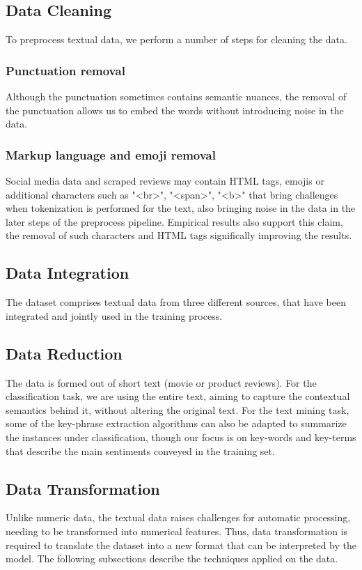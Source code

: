 \subsection{Data Cleaning}
To preprocess textual data, we perform a number of steps for cleaning the data. 

\subsubsection{Punctuation removal}
Although the punctuation sometimes contains semantic nuances, the removal of the punctuation allows us to embed the words without introducing noise in the data.
\subsubsection{Markup language and emoji removal}
Social media data and scraped reviews may contain HTML tags, emojis or additional characters such as "\textless br\textgreater", "\textless span\textgreater", "\textless b\textgreater" that bring challenges when tokenization is performed for the text, also bringing noise in the data in the later steps of the preprocess pipeline. Empirical results also support this claim, the removal of such characters and HTML tags significally improving the results.


\subsection{Data Integration}
The dataset comprises textual data from three different sources, that have been integrated and jointly used in the training process.

\subsection{Data Reduction}
The data is formed out of short text (movie or product reviews). For the classification task, we are using the entire text, aiming to capture the contextual semantics behind it, without altering the original text. For the text mining task, some of the key-phrase extraction algorithms can also be adapted to summarize the instances under classification, though our focus is on key-words and key-terms that describe the main sentiments conveyed in the training set.

\subsection{Data Transformation}
Unlike numeric data, the textual data raises challenges for automatic processing, needing to be transformed into numerical features. Thus, data transformation is required to translate the dataset into a new format that can be interpreted by the model. The following subsections describe the techniques applied on the data.

